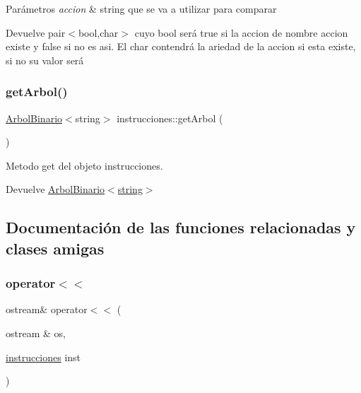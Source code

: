\begin{DoxyParams}{Parámetros}
{\em accion} & string que se va a utilizar para comparar \\
\hline
\end{DoxyParams}
\begin{DoxyReturn}{Devuelve}
pair$<$bool,char$>$ cuyo bool será true si la accion de nombre accion existe y false si no es asi. El char contendrá la ariedad de la accion si esta existe, si no su valor será \textquotesingle{} \textquotesingle{} 
\end{DoxyReturn}
\mbox{\label{classinstrucciones_a9d538294d3c24242b6fa6b6bcece4896}} 
\subsubsection{\texorpdfstring{get\+Arbol()}{getArbol()}}
{\footnotesize\ttfamily \hyperlink{classArbolBinario}{Arbol\+Binario}$<$string$>$ instrucciones\+::get\+Arbol (\begin{DoxyParamCaption}{ }\end{DoxyParamCaption})}



Metodo get del objeto instrucciones. 

\begin{DoxyReturn}{Devuelve}
\hyperlink{classArbolBinario}{Arbol\+Binario$<$string$>$} 
\end{DoxyReturn}


\subsection{Documentación de las funciones relacionadas y clases amigas}
\mbox{\label{classinstrucciones_a18db657893cefcd60d7b79becb90a1c5}} 
\subsubsection{\texorpdfstring{operator$<$$<$}{operator<<}}
{\footnotesize\ttfamily ostream\& operator$<$$<$ (\begin{DoxyParamCaption}\item[{ostream \&}]{os,  }\item[{\hyperlink{classinstrucciones}{instrucciones}}]{inst }\end{DoxyParamCaption})\hspace{0.3cm}{\ttfamily [friend]}}



